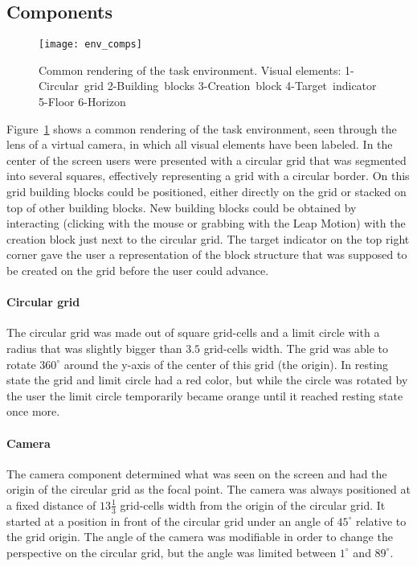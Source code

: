 \subsection{Components}\label{sec:components}

\begin{figure}[H]
\centering
\texttt{[image: env\_comps]}
\caption{\label{fig:environmentcomps} Common rendering of the task environment. Visual elements: 1-Circular~grid 2-Building~blocks 3-Creation~block 4-Target~indicator 5-Floor 
6-Horizon}
\end{figure}

\noindent Figure~\ref{fig:environmentcomps} shows a common rendering of the task environment, seen through the lens of a virtual camera, in which all visual elements have been 
labeled. In the center of the screen users were presented with a circular grid that was segmented into several squares, effectively representing a grid with a circular border. 
On this grid building blocks could be positioned, either directly on the grid or stacked on top of other building blocks. New building blocks could be obtained by interacting 
(clicking with the mouse or grabbing with the Leap Motion) with the creation block just next to the circular grid. The target indicator on the top right corner gave the user a 
representation of the block structure that was supposed to be created on the grid before the user could advance.

\paragraph{Circular grid}
The circular grid was made out of square grid-cells and a limit circle with a radius that was slightly bigger than $3.5$ grid-cells width. The grid was able to rotate 
$360^{\circ}$ around the y-axis of the center of this grid (the origin). In resting state the grid and limit circle had a red color, but while the circle was rotated by the 
user the limit circle temporarily became orange until it reached resting state once more. 

\paragraph{Camera}
The camera component determined what was seen on the screen and had the origin of the circular grid as the focal point. The camera was always positioned at a fixed 
distance of $13 \frac{1}{3}$ grid-cells width from the origin of the circular grid. It started at a position in front of the circular grid under an angle of $45^{\circ}$ relative to the grid origin. The angle of the camera was modifiable in order to change the perspective on the circular grid, but the angle was limited between $1^{\circ}$ and $89^{\circ}$.

